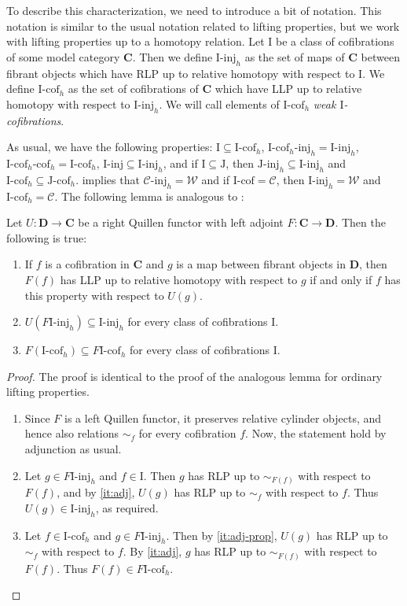 \documentclass{tac}
\theoremstyle{definition}
\newcommand{\we}{\mathcal{W}}
\newcommand{\cof}{\mathcal{C}}
\newcommand{\cat}[1]{\mathbf{#1}}
\newcommand{\C}{\cat{C}}
\newcommand{\D}{\cat{D}}
\newcommand{\I}{\mathrm{I}}
\newcommand{\J}{\mathrm{J}}
\newcommand{\class}[2]{#1\text{-}\mathrm{#2}}
\newcommand{\Iinj}[1][\I]{\class{#1}{inj}}
\newcommand{\Icof}[1][\I]{\class{#1}{cof}}
\newcommand{\Jinj}[1][]{\Iinj[\J#1]}
\newcommand{\Jcof}[1][]{\Icof[\J#1]}
\begin{document}
To describe this characterization, we need to introduce a bit of notation.
This notation is similar to the usual notation related to lifting properties, but we work with lifting properties up to a homotopy relation.
Let $\I$ be a class of cofibrations of some model category $\C$.
Then we define $\Iinj_h$ as the set of maps of $\C$ between fibrant objects which have RLP up to relative homotopy with respect to $\I$.
We define $\Icof_h$ as the set of cofibrations of $\C$ which have LLP up to relative homotopy with respect to $\Iinj_h$.
We will call elements of $\Icof_h$ \emph{weak $\I$-cofibrations}.

As usual, we have the following properties: $\I \subseteq \Icof_h$, $\Iinj[\Icof_h]_h = \Iinj_h$, $\Icof[\Icof_h]_h = \Icof_h$, $\Iinj \subseteq \Iinj_h$,
and if $\I \subseteq \J$, then $\Jinj_h \subseteq \Iinj_h$ and $\Icof_h \subseteq \Jcof_h$.
 implies that $\Iinj[\cof]_h = \we$ and if $\Icof = \cof$, then $\Iinj_h = \we$ and $\Icof_h = \cof$.
The following lemma is analogous to \cite[Lemma~2.1.8]{hovey}:

\begin{lem}
Let $U : \D \to \C$ be a right Quillen functor with left adjoint $F : \C \to \D$.
Then the following is true:
\begin{enumerate}
\item \label{it:adj} If $f$ is a cofibration in $\C$ and $g$ is a map between fibrant objects in $\D$,
then $F(f)$ has LLP up to relative homotopy with respect to $g$ if and only if $f$ has this property with respect to $U(g)$.
\item \label{it:adj-prop} $U(\Iinj[F\I]_h) \subseteq \Iinj_h$ for every class of cofibrations $\I$.
\item $F(\Icof_h) \subseteq \Icof[F\I]_h$ for every class of cofibrations $\I$.
\end{enumerate}
\end{lem}
\begin{proof}
The proof is identical to the proof of the analogous lemma for ordinary lifting properties.
\begin{enumerate}
\item Since $F$ is a left Quillen functor, it preserves relative cylinder objects, and hence also relations $\sim_f$ for every cofibration $f$.
Now, the statement hold by adjunction as usual.
\item Let $g \in \Iinj[F\I]_h$ and $f \in \I$.
Then $g$ has RLP up to $\sim_{F(f)}$ with respect to $F(f)$, and by \eqref{it:adj}, $U(g)$ has RLP up to $\sim_f$ with respect to $f$.
Thus $U(g) \in \Iinj_h$, as required.
\item Let $f \in \Icof_h$ and $g \in \Iinj[F\I]_h$.
Then by \eqref{it:adj-prop}, $U(g)$ has RLP up to $\sim_f$ with respect to $f$.
By \eqref{it:adj}, $g$ has RLP up to $\sim_{F(f)}$ with respect to $F(f)$.
Thus $F(f) \in \Icof[F\I]_h$.
\end{enumerate}
\end{proof}
\end{document}
